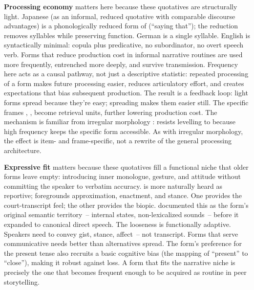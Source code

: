 \textbf{Processing economy} matters here because these quotatives are structurally light. Japanese  (as an informal, reduced quotative with comparable discourse advantages) is a phonologically reduced form of  (\enquote{saying that}); the reduction removes syllables while preserving function. German  is a single syllable. English  is syntactically minimal: copula plus predicative, no subordinator, no overt speech verb. Forms that reduce production cost in informal narrative routines are used more frequently, entrenched more deeply, and survive transmission. Frequency here acts as a causal pathway, not just a descriptive statistic: repeated processing of a form makes future processing easier, reduces articulatory effort, and creates expectations that bias subsequent production. The result is a feedback loop: light forms spread because they're easy; spreading makes them easier still. The specific frames , ,  become retrieval units, further lowering production cost. The mechanism is familiar from irregular morphology \autocite{bybee2006}:  resists levelling to  because high frequency keeps the specific form accessible. As with irregular morphology, the effect is item- and frame-specific, not a rewrite of the general processing architecture.

\textbf{Expressive fit} matters because these quotatives fill a functional niche that older forms leave empty: introducing inner monologue, gesture, and attitude without committing the speaker to verbatim accuracy.  is more naturally heard as reportive;  foregrounds approximation, enactment, and stance. One provides the court-transcript feel; the other provides the biopic. \textcite{ferrarabell1995} documented this as the form's original semantic territory~-- internal states, non-lexicalized sounds~-- before it expanded to canonical direct speech. The looseness is functionally adaptive. Speakers need to convey gist, stance, affect~-- not transcript. Forms that serve communicative needs better than alternatives spread. The form's preference for the present tense also recruits a basic cognitive bias (the mapping of \enquote{present} to \enquote{close}), making it robust against loss. A form that fits the narrative niche is precisely the one that becomes frequent enough to be acquired as routine in peer storytelling.

